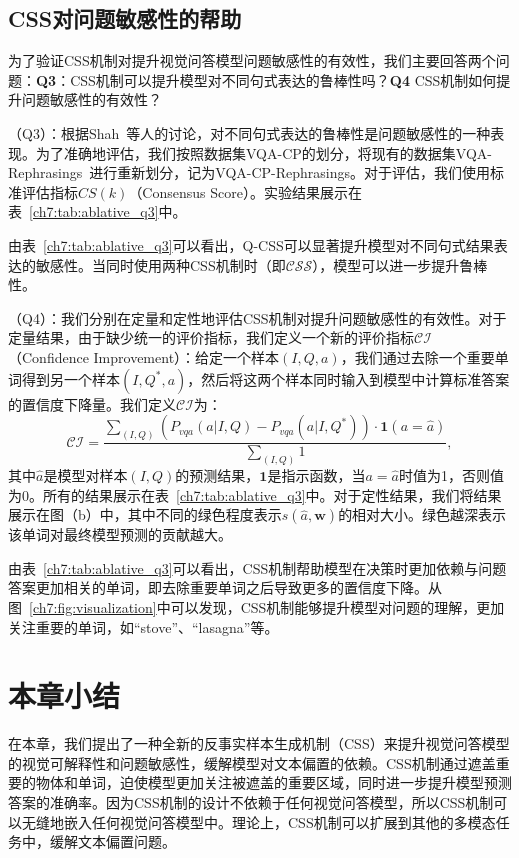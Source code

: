 \subsection{CSS对问题敏感性的帮助}
为了验证CSS机制对提升视觉问答模型问题敏感性的有效性，我们主要回答两个问题：\textbf{Q3}：CSS机制可以提升模型对不同句式表达的鲁棒性吗？\textbf{Q4} CSS机制如何提升问题敏感性的有效性？

\textbf{}（Q3）：根据Shah~\cite{shah2019cycle}等人的讨论，对不同句式表达的鲁棒性是问题敏感性的一种表现。为了准确地评估，我们按照数据集VQA-CP的划分，将现有的数据集VQA-Rephrasings~\cite{shah2019cycle}进行重新划分，记为VQA-CP-Rephrasings。对于评估，我们使用标准评估指标$CS(k)$（Consensus Score）。实验结果展示在表~\ref{ch7:tab:ablative_q3}中。

由表~\ref{ch7:tab:ablative_q3}可以看出，Q-CSS可以显著提升模型对不同句式结果表达的敏感性。当同时使用两种CSS机制时（即$\mathcal{CSS}$），模型可以进一步提升鲁棒性。

\textbf{}（Q4）：我们分别在定量和定性地评估CSS机制对提升问题敏感性的有效性。对于定量结果，由于缺少统一的评价指标，我们定义一个新的评价指标$\mathcal{CI}$（Confidence Improvement）：给定一个样本$(I, Q, a)$，我们通过去除一个重要单词得到另一个样本$(I, Q^*, a)$，然后将这两个样本同时输入到模型中计算标准答案的置信度下降量。我们定义$\mathcal{CI}$为：
\begin{equation}
\mathcal{CI} = \frac{\sum_{(I, Q)}  (P_{vqa}(a | I, Q) - P_{vqa}(a | I, Q^*)) \cdot \mathbf{1}(a = \hat{a}) }{\sum_{(I, Q)} 1},
\end{equation}
其中$\hat{a}$是模型对样本$(I, Q)$的预测结果，$\mathbf{1}$是指示函数，当$a = \hat{a}$时值为1，否则值为0。所有的结果展示在表~\ref{ch7:tab:ablative_q3}中。对于定性结果，我们将结果展示在图（b）中，其中不同的绿色程度表示$s(\hat{a}, \bm{w})$的相对大小。绿色越深表示该单词对最终模型预测的贡献越大。

由表~\ref{ch7:tab:ablative_q3}可以看出，CSS机制帮助模型在决策时更加依赖与问题答案更加相关的单词，即去除重要单词之后导致更多的置信度下降。从图~\ref{ch7:fig:visualization}中可以发现，CSS机制能够提升模型对问题的理解，更加关注重要的单词，如“stove”、“lasagna”等。


\section{本章小结}
在本章，我们提出了一种全新的反事实样本生成机制（CSS）来提升视觉问答模型的视觉可解释性和问题敏感性，缓解模型对文本偏置的依赖。CSS机制通过遮盖重要的物体和单词，迫使模型更加关注被遮盖的重要区域，同时进一步提升模型预测答案的准确率。因为CSS机制的设计不依赖于任何视觉问答模型，所以CSS机制可以无缝地嵌入任何视觉问答模型中。理论上，CSS机制可以扩展到其他的多模态任务中，缓解文本偏置问题。

